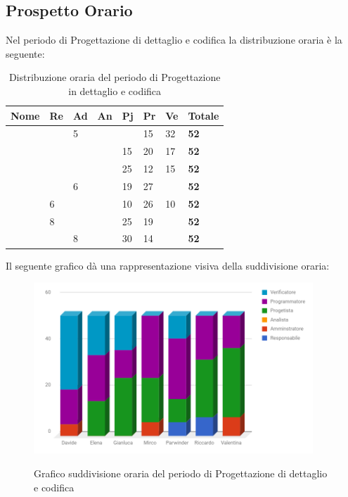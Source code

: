 \documentclass[PianoDiProgetto.tex]{subfiles}
\begin{document}
\subsection{Prospetto Orario}
Nel periodo di Progettazione di dettaglio e codifica la distribuzione oraria è la seguente:
\begin{center}
	\begin{table}[htbp]
		\centering
		\renewcommand\arraystretch{1.5}
		\begin{tabularx}{\textwidth}{p{4cm}|p{1cm}|p{1cm}|p{1cm}|p{1cm}|p{1cm}|p{1cm}|p{2cm}}
			\hline
			\textbf{Nome} & \textbf{Re} & \textbf{Ad} & \textbf{An} & \textbf{Pj} & \textbf{Pr} & \textbf{Ve} & \textbf{Totale} \\
			\hline
			\Davide & \ & 5 & \ & \ & 15 & 32 & \textbf{52} \\
			\hline
			\Elena & \ & \ & \ & 15 & 20 & 17 & \textbf{52} \\
			\hline
			\Gianluca & \ & \ & \ & 25 & 12 & 15 & \textbf{52} \\
			\hline
			\Mirco & \ & 6 & \ & 19 & 27 & \ & \textbf{52} \\
			\hline
			\Parwinder & 6 & \ & \ & 10 & 26 & 10 & \textbf{52} \\
			\hline
			\Riccardo & 8 & \ & \ & 25 & 19 & \ & \textbf{52} \\
			\hline
			\Valentina & \ & 8 & \ & 30 & 14 & \ & \textbf{52} \\
			\hline
		\end{tabularx}
	\caption{Distribuzione oraria del periodo di Progettazione in dettaglio e codifica}
	\label{my-label}
	\end{table} 	
\end{center}
Il seguente grafico dà una rappresentazione visiva della suddivisione oraria:
\begin{figure}[h]
	\centering
	\includegraphics[width=10.5cm]{images/prospettoOrario/progCod.png}
	\label{fig:foo}
	\caption{Grafico suddivisione oraria del periodo di Progettazione di dettaglio e codifica}
\end{figure} 
\newpage
\end{document}
